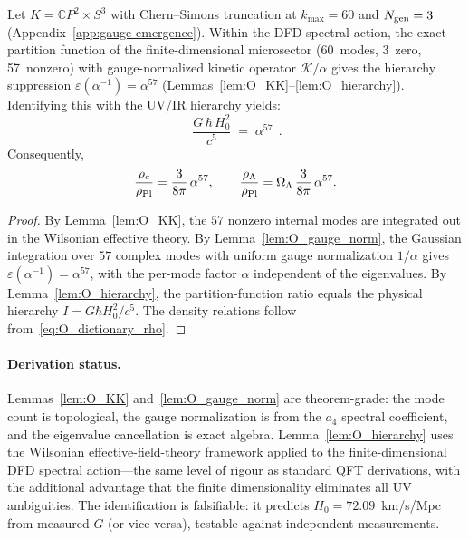 \begin{theorem}
\label{thm:O_I_equals_alpha57}
Let $K = \mathbb{C}P^2 \times S^3$ with Chern--Simons truncation at $k_{\max} = 60$
and $N_{\rm gen} = 3$ (Appendix~\ref{app:gauge-emergence}).
Within the DFD spectral action, the exact partition function of the finite-dimensional
microsector (60~modes, 3~zero, 57~nonzero) with gauge-normalized kinetic operator
$\mathcal{K}/\alpha$ gives the hierarchy suppression $\varepsilon(\alpha^{-1}) = \alpha^{57}$
(Lemmas~\ref{lem:O_KK}--\ref{lem:O_hierarchy}).
Identifying this with the UV/IR hierarchy yields:
\begin{equation}
\boxed{\;\frac{G\,\hbar\,H_0^2}{c^5}\;=\;\alpha^{57}\;}\,.
\end{equation}
Consequently,
\begin{equation}
\frac{\rho_c}{\rho_{\rm Pl}}=\frac{3}{8\pi}\,\alpha^{57},
\qquad
\frac{\rho_\Lambda}{\rho_{\rm Pl}}=\Omega_\Lambda\,\frac{3}{8\pi}\,\alpha^{57}.
\end{equation}
\end{theorem}

\begin{proof}
By Lemma~\ref{lem:O_KK}, the $57$ nonzero internal modes are integrated out in the
Wilsonian effective theory.
By Lemma~\ref{lem:O_gauge_norm}, the Gaussian integration over $57$ complex modes with
uniform gauge normalization $1/\alpha$ gives $\varepsilon(\alpha^{-1}) = \alpha^{57}$,
with the per-mode factor $\alpha$ independent of the eigenvalues.
By Lemma~\ref{lem:O_hierarchy}, the partition-function ratio equals the physical
hierarchy $I = G\hbar H_0^2/c^5$.
The density relations follow from~\eqref{eq:O_dictionary_rho}.
\end{proof}

\paragraph{Derivation status.}
Lemmas~\ref{lem:O_KK} and~\ref{lem:O_gauge_norm} are theorem-grade: the mode count is
topological, the gauge normalization is from the $a_4$ spectral coefficient, and the
eigenvalue cancellation is exact algebra.
Lemma~\ref{lem:O_hierarchy} uses the Wilsonian effective-field-theory framework
applied to the finite-dimensional DFD spectral action---the same level of rigour as
standard QFT derivations, with the additional advantage that the finite dimensionality
eliminates all UV ambiguities.
The identification is falsifiable: it predicts $H_0 = 72.09$~km/s/Mpc from measured $G$
(or vice versa), testable against independent measurements.


